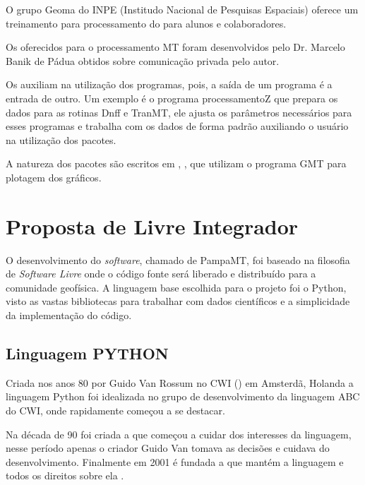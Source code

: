         O grupo Geoma do INPE (Institudo Nacional de Pesquisas Espaciais) oferece um treinamento para processamento do \MT para alunos e colaboradores.
        
        Os  oferecidos para o processamento MT foram desenvolvidos pelo Dr. Marcelo Banik de Pádua obtidos sobre comunicação privada pelo autor.
        
        Os  auxiliam na utilização dos programas, pois, a saída de um programa é a entrada de outro. Um exemplo é o programa processamentoZ que prepara os dados para as rotinas Dnff e TranMT, ele ajusta os parâmetros necessários para esses programas e trabalha com os dados de forma padrão auxiliando o usuário na utilização dos pacotes. 
        
        A natureza dos pacotes são  escritos em , ,  que utilizam o programa GMT \cite{gmt} para plotagem dos gráficos.
    
    

    
    
    \chapter{Proposta de  Livre Integrador}
    
        O desenvolvimento do \textit{software}, chamado de PampaMT, foi baseado na filosofia de \textit{Software Livre} \cite{soft_free} onde o código fonte será liberado e distribuído para a comunidade geofísica. A linguagem base escolhida para o projeto foi o Python, visto as vastas bibliotecas para trabalhar com dados científicos e a simplicidade da implementação do código.  
        
        \section{Linguagem PYTHON}
            \label{lim_python}
            
            Criada nos anos 80 por Guido Van Rossum no CWI () em Amsterdã, Holanda a linguagem Python foi idealizada no grupo de desenvolvimento da linguagem ABC do CWI, onde rapidamente começou a se destacar.
            
            Na década de 90 foi criada a  que começou a cuidar dos interesses da linguagem, nesse período apenas o criador Guido Van tomava as decisões e cuidava do desenvolvimento. Finalmente em 2001 é fundada a  que mantém a linguagem e todos os direitos sobre ela \cite{python36}.  
            
